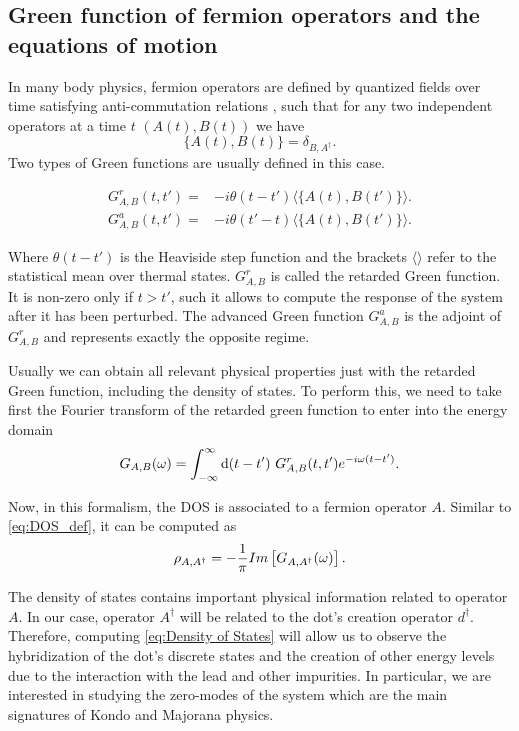 \subsection{Green function of fermion operators and the equations of motion}

 In many body physics, fermion operators are defined by quantized fields over time satisfying anti-commutation relations , such that for any two independent operators at a time $t$ $(A(t)  , B(t))$  we have
 \begin{equation}
    \{ A(t) , B(t) \} = \delta_{B,A^\dagger} .
 \end{equation}
\noindent  Two types of Green functions are usually defined in this case.

 \begin{align}
  G^r_{A,B}(t,t') =& -i\theta(t-t')\langle \{ A(t) , B(t') \} \rangle  .  \label{eq:TempGreen}  \\
   G^a_{A,B}(t,t') =& -i\theta(t'-t)\langle \{ A(t) , B(t') \} \rangle  .
 \end{align}
  
\noindent Where $\theta(t-t')$ is the Heaviside step function and  the brackets $\langle \rangle$ refer to the statistical mean over thermal states. $G^r_{A,B}$ is called the retarded Green function. It is non-zero only if $t>t'$, such it allows to compute the response of the system after it has been perturbed. 
 The advanced Green function $G^a_{A,B}$ is the adjoint of $G^r_{A,B}$ and represents exactly the opposite regime. 

  Usually we can obtain all relevant physical properties just with the retarded Green function, including the density of states.  To perform this, we need to take first the Fourier transform of the retarded green function to enter into the energy domain
\begin{equation}
   G_{A,B}(\omega)=\int_{-\infty}^{\infty}\text{d}(t-t')\  G^r_{A,B}(t,t')e^{-i\omega(t-t')}.
\end{equation}

 \noindent Now, in this formalism, the DOS is associated to a fermion operator $A$. Similar to  \eqref{eq:DOS_def}, it can be computed as 
\begin{equation}
    \rho_{A,A^\dagger}=-\frac{1}{\pi}Im\left[G_{A,A^\dagger}(\omega)\right].
    \label{eq:Density of States}
\end{equation}

The density of states contains important physical information related to operator $A$. In our case, operator $A^\dagger$ will be related to the dot's creation operator  $d^\dagger$. Therefore,  computing \eqref{eq:Density of States} will allow us to observe the hybridization of the dot's discrete states and the creation of other energy levels due to the interaction with the lead and other impurities. In particular, we are interested in studying the zero-modes of the system which are the main signatures of Kondo and Majorana physics. 





